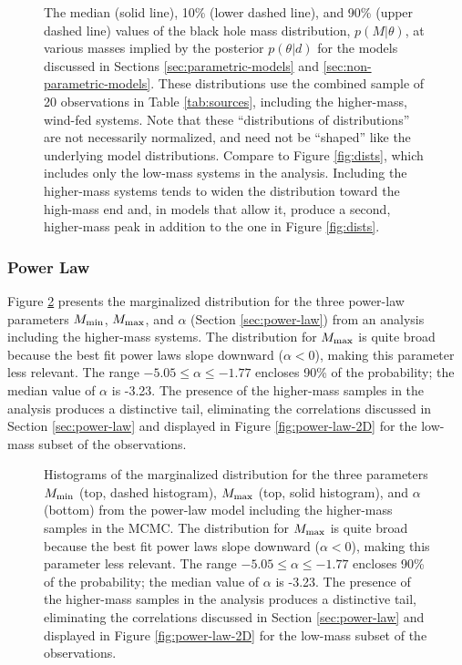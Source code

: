 \documentclass[preprint]{aastex}
\newcommand{\Mmin}{M_{\textnormal{min}}}
\newcommand{\Mmax}{M_{\textnormal{max}}}
\begin{document}
\begin{figure}
  \begin{center}
  \end{center}
  \caption{\label{fig:high-mass-dists} The median (solid line), 10\%
    (lower dashed line), and 90\% (upper dashed line) values of the
    black hole mass distribution, $p(M|\theta)$, at various masses
    implied by the posterior $p(\theta|d)$ for the models discussed in
    Sections \ref{sec:parametric-models} and
    \ref{sec:non-parametric-models}.  These distributions use the
    combined sample of 20 observations in Table \ref{tab:sources},
    including the higher-mass, wind-fed systems.  Note that these
    ``distributions of distributions'' are not necessarily normalized,
    and need not be ``shaped'' like the underlying model
    distributions.  Compare to Figure \ref{fig:dists}, which includes
    only the low-mass systems in the analysis.  Including the
    higher-mass systems tends to widen the distribution toward the
    high-mass end and, in models that allow it, produce a second,
    higher-mass peak in addition to the one in Figure
    \ref{fig:dists}. }
\end{figure}

\subsubsection{Power Law}

Figure \ref{fig:power-law-high} presents the marginalized
distribution for the three power-law parameters $\Mmin$, $\Mmax$, and
$\alpha$ (Section \ref{sec:power-law}) from an analysis including the
higher-mass systems.  The distribution for $\Mmax$ is quite broad
because the best fit power laws slope downward ($\alpha < 0$), making
this parameter less relevant.  The range $-5.05 \leq \alpha \leq
-1.77$ encloses 90\% of the probability; the median value of $\alpha$
is -3.23.  The presence of the higher-mass samples in the analysis
produces a distinctive tail, eliminating the correlations discussed in
Section \ref{sec:power-law} and displayed in Figure
\ref{fig:power-law-2D} for the low-mass subset of the observations.

\begin{figure}
  \begin{center}
  \end{center}
  \caption{\label{fig:power-law-high} Histograms of the marginalized
    distribution for the three parameters $\Mmin$ (top, dashed
    histogram), $\Mmax$ (top, solid histogram), and $\alpha$ (bottom)
    from the power-law model including the higher-mass samples in the
    MCMC.  The distribution for $\Mmax$ is quite broad because the
    best fit power laws slope downward ($\alpha < 0$), making this
    parameter less relevant.  The range $-5.05 \leq \alpha \leq -1.77$
    encloses 90\% of the probability; the median value of $\alpha$ is
    -3.23.  The presence of the higher-mass samples in the analysis
    produces a distinctive tail, eliminating the correlations
    discussed in Section \ref{sec:power-law} and displayed in Figure
    \ref{fig:power-law-2D} for the low-mass subset of the
    observations. }
\end{figure}
\end{document}
